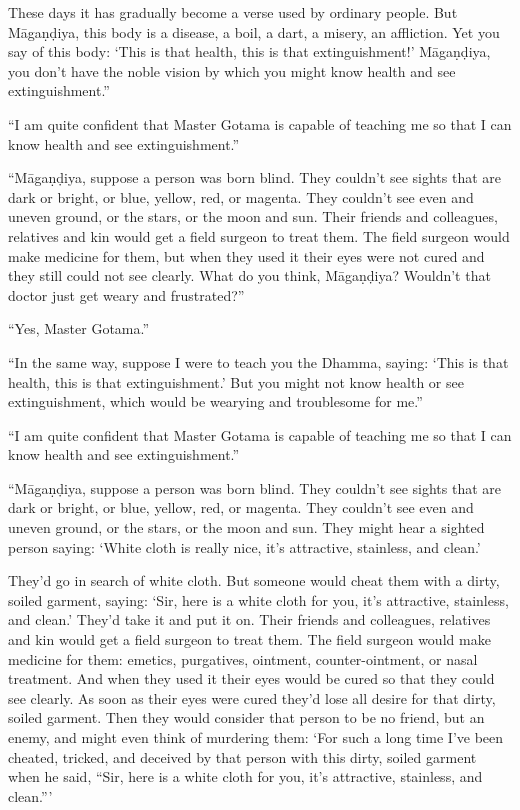 \documentclass[12pt,openany]{book}%
\begin{document}
These days it has gradually become a verse used by ordinary people. But \textsanskrit{Māgaṇḍiya}, this body is a disease, a boil, a dart, a misery, an affliction. Yet you say of this body: ‘This is that health, this is that extinguishment!’ \textsanskrit{Māgaṇḍiya}, you don’t have the noble vision by which you might know health and see extinguishment.” 

“I am quite confident that Master Gotama is capable of teaching me so that I can know health and see extinguishment.” 

“\textsanskrit{Māgaṇḍiya}, suppose a person was born blind. They couldn’t see sights that are dark or bright, or blue, yellow, red, or magenta. They couldn’t see even and uneven ground, or the stars, or the moon and sun. Their friends and colleagues, relatives and kin would get a field surgeon to treat them. The field surgeon would make medicine for them, but when they used it their eyes were not cured and they still could not see clearly. What do you think, \textsanskrit{Māgaṇḍiya}? Wouldn’t that doctor just get weary and frustrated?” 

“Yes, Master Gotama.” 

“In the same way, suppose I were to teach you the Dhamma, saying: ‘This is that health, this is that extinguishment.’ But you might not know health or see extinguishment, which would be wearying and troublesome for me.” 

“I am quite confident that Master Gotama is capable of teaching me so that I can know health and see extinguishment.” 

“\textsanskrit{Māgaṇḍiya}, suppose a person was born blind. They couldn’t see sights that are dark or bright, or blue, yellow, red, or magenta. They couldn’t see even and uneven ground, or the stars, or the moon and sun. They might hear a sighted person saying: ‘White cloth is really nice, it’s attractive, stainless, and clean.’ 

They’d go in search of white cloth. But someone would cheat them with a dirty, soiled garment, saying: ‘Sir, here is a white cloth for you, it’s attractive, stainless, and clean.’ They’d take it and put it on. Their friends and colleagues, relatives and kin would get a field surgeon to treat them. The field surgeon would make medicine for them: emetics, purgatives, ointment, counter-ointment, or nasal treatment. And when they used it their eyes would be cured so that they could see clearly. As soon as their eyes were cured they’d lose all desire for that dirty, soiled garment. Then they would consider that person to be no friend, but an enemy, and might even think of murdering them: ‘For such a long time I’ve been cheated, tricked, and deceived by that person with this dirty, soiled garment when he said, “Sir, here is a white cloth for you, it’s attractive, stainless, and clean.”’ 
\end{document}
